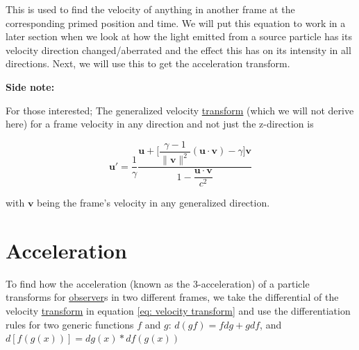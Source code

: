 This is used to find the velocity of anything in another frame at the corresponding primed position and time.
We will put this equation to work in a later section when we look at how the light emitted from a source particle has its velocity direction changed/aberrated and the effect this has on its intensity in all directions. Next, we will use this to get the acceleration transform.

\textbf{Side note:}

For those interested; The generalized velocity \hyperlink{def-transform}{transform} (which we will not derive here) for a frame velocity in any direction and not just the z-direction is

\begin{equation}
	\mathbf{u}{'} = \dfrac{1}{{\gamma}} \dfrac{\mathbf{u} + \Big[\dfrac{{\gamma}-1}{\|\mathbf{v}\|^2}(\mathbf{u}\cdot \mathbf{v})-{\gamma} \Big] \mathbf{v}}{1-\dfrac{\mathbf{u}\cdot\mathbf{v}}{{c}^2}}
\end{equation}

with ${\mathbf{v}}$ being the frame's velocity in any generalized direction.

\section{Acceleration} \label{sect: Acceleration}

To find how the acceleration (known as the 3-acceleration) of a particle transforms for \hyperlink{def-observer}{observer}s in two different frames, we take the differential of the velocity \hyperlink{def-transform}{transform} in equation \eqref{eq: velocity transform} and use the differentiation rules for two generic functions ${f}$ and ${g}$: ${d(gf)} = {f} {dg} + {g} {df}$, and ${d[{{f}({g}(x))}]} = {{dg}(x)} * {df({{g}(x)})}$

